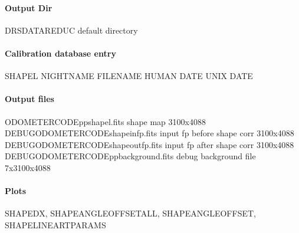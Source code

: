 \documentclass[a4paper,10pt,english]{report}
\begin{document}
\paragraph{Output Dir}
\label{\detokenize{user/spirou/recipes/shape_local:output-dir}}
\begin{sphinxVerbatim}[commandchars=\\\{\}]
DRS\PYGZus{}DATA\PYGZus{}REDUC    default  directory
\end{sphinxVerbatim}


\paragraph{Calibration database entry}
\label{\detokenize{user/spirou/recipes/shape_local:calibration-database-entry}}
\begin{sphinxVerbatim}[commandchars=\\\{\}]
SHAPEL NIGHT\PYGZus{}NAME FILENAME HUMAN DATE UNIX DATE
\end{sphinxVerbatim}


\paragraph{Output files}
\label{\detokenize{user/spirou/recipes/shape_local:output-files}}
\begin{sphinxVerbatim}[commandchars=\\\{\}]
ODOMETER\PYGZus{}CODE\PYGZus{}pp\PYGZus{}shapel.fits              shape map 3100x4088
DEBUG\PYGZus{}ODOMETER\PYGZus{}CODE\PYGZus{}shape\PYGZus{}in\PYGZus{}fp.fits     input fp before shape corr 3100x4088
DEBUG\PYGZus{}ODOMETER\PYGZus{}CODE\PYGZus{}shape\PYGZus{}out\PYGZus{}fp.fits    input fp after shape corr 3100x4088
DEBUG\PYGZus{}ODOMETER\PYGZus{}CODE\PYGZus{}pp\PYGZus{}background.fits  debug background file 7x3100x4088
\end{sphinxVerbatim}


\paragraph{Plots}
\label{\detokenize{user/spirou/recipes/shape_local:plots}}
\begin{sphinxVerbatim}[commandchars=\\\{\}]
SHAPE\PYGZus{}DX, SHAPE\PYGZus{}ANGLE\PYGZus{}OFFSET\PYGZus{}ALL, SHAPE\PYGZus{}ANGLE\PYGZus{}OFFSET, SHAPE\PYGZus{}LINEAR\PYGZus{}TPARAMS
\end{sphinxVerbatim}
\end{document}
